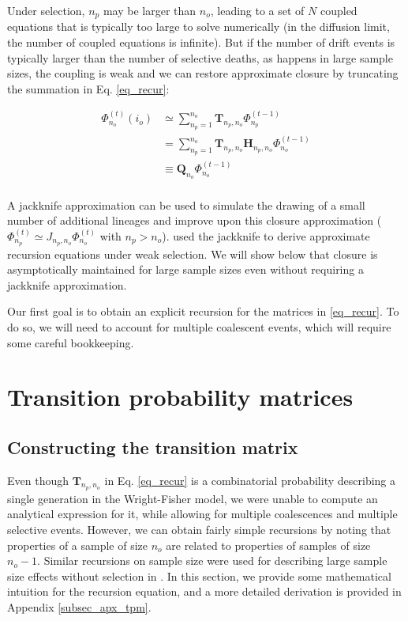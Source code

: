 \documentclass[review]{elsarticle}
\newcommand{\afs}[2]{\Phi_{#1}^{(#2)}}
\begin{document}
Under selection, $n_{p}$ may be larger than $n_o$, leading to a set of $N$ coupled equations that is
typically too large to solve numerically (in the diffusion limit, the number of coupled equations is
infinite). But if the number of drift events is typically larger than the number of selective
deaths, as happens in large sample sizes, the coupling is weak and we can restore approximate
closure by truncating the summation in Eq. \ref{eq_recur}:

\begin{equation}
\begin{split}
  \afs{n_o}{t}(i_o)
  &\simeq \sum_{n_p=1}^{n_{o}} \mathbf{T}_{n_p,n_o}                      \afs{n_p}{t-1}\\
  &=      \sum_{n_p=1}^{n_{o}} \mathbf{T}_{n_p,n_o} \mathbf{H}_{n_p,n_o} \afs{n_o}{t-1}\\
  &\equiv \mathbf{Q}_{n_o}                                               \afs{n_o}{t-1}\\
\end{split}
\label{eq_truncated}
\end{equation}

A jackknife approximation \citep{Gravel2016} can be used to simulate the drawing of a small number
of additional lineages and improve upon this closure approximation
($\afs{n_p}{t} \simeq J_{n_p,n_o} \afs{n_o}{t}$ with $n_p>n_o$). \cite{JouganousEtAl2017} used the
jackknife to derive approximate recursion equations under weak selection. We will show below that
closure is asymptotically maintained for large sample sizes even without requiring a jackknife
approximation.

Our first goal is to obtain an explicit recursion for the matrices in \eqref{eq_recur}. To do so, we
will need to account for multiple coalescent events, which will require some careful bookkeeping.

\section{Transition probability matrices}
\label{sec_trans_mat}

\subsection{Constructing the transition matrix}
\label{subsec_trans_mat}

Even though $\mathbf{T}_{n_p,n_o}$ in Eq. \ref{eq_recur} is a combinatorial probability
describing a single generation in the Wright-Fisher model, we were unable to compute an analytical
expression for it, while allowing for multiple coalescences and multiple selective events. 
However,
we can obtain fairly simple recursions by noting that properties of a sample of size $n_o$ are
related to properties of samples of size $n_o-1.$ Similar recursions on sample size were used for
describing large sample size effects without selection in \citep{BhaskarEtAl2014}. In this section,
we provide some mathematical intuition for the recursion equation, and a more detailed derivation is provided in
Appendix \ref{subsec_apx_tpm}.
\end{document}
